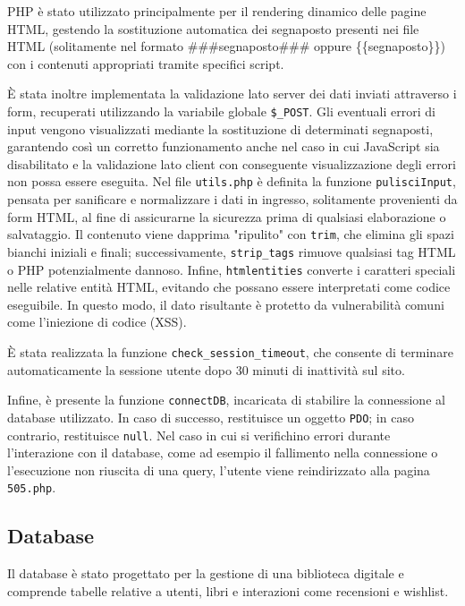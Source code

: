 \documentclass{article}
\begin{document}
PHP è stato utilizzato principalmente per il rendering dinamico delle pagine HTML, gestendo la sostituzione automatica dei segnaposto presenti nei file HTML (solitamente nel formato \#\#\#segnaposto\#\#\# oppure \{\{segnaposto\}\}) con i contenuti appropriati tramite specifici script.

È stata inoltre implementata la validazione lato server dei dati inviati attraverso i form, recuperati utilizzando la variabile globale \texttt{\$\_POST}. Gli eventuali errori di input vengono visualizzati mediante la sostituzione di determinati segnaposti, garantendo così un corretto funzionamento anche nel caso in cui JavaScript sia disabilitato e la validazione lato client con conseguente visualizzazione degli errori non possa essere eseguita.
Nel file \texttt{utils.php} è definita la funzione \texttt{pulisciInput}, pensata per sanificare e normalizzare i dati in ingresso, solitamente provenienti da form HTML, al fine di assicurarne la sicurezza prima di qualsiasi elaborazione o salvataggio.
Il contenuto viene dapprima "ripulito" con \texttt{trim}, che elimina gli spazi bianchi iniziali e finali; successivamente, \texttt{strip\_tags} rimuove qualsiasi tag HTML o PHP potenzialmente dannoso.
Infine, \texttt{htmlentities} converte i caratteri speciali nelle relative entità HTML, evitando che possano essere interpretati come codice eseguibile.
In questo modo, il dato risultante è protetto da vulnerabilità comuni come l'iniezione di codice (XSS).

È stata realizzata la funzione \texttt{check\_session\_timeout}, che consente di terminare automaticamente la sessione utente dopo 30 minuti di inattività sul sito.

Infine, è presente la funzione \texttt{connectDB}, incaricata di stabilire la connessione al database utilizzato. In caso di successo, restituisce un oggetto \texttt{PDO}; in caso contrario, restituisce \texttt{null}.
Nel caso in cui si verifichino errori durante l'interazione con il database, come ad esempio il fallimento nella connessione o l'esecuzione non riuscita di una query, l'utente viene reindirizzato alla pagina \texttt{505.php}.
\subsection{Database}
Il database è stato progettato per la gestione di una biblioteca digitale e comprende tabelle relative a utenti, libri e interazioni come recensioni e wishlist.
\end{document}
